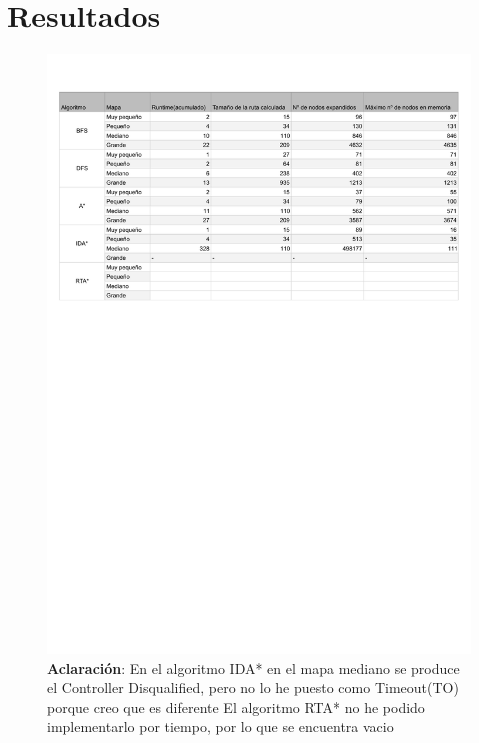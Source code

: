 \documentclass{article}
\begin{document}
\newpage \section{\large{Resultados}}
\begin{figure}[h]
  \includegraphics[scale=0.5]{resultados.pdf}
  \centering
  \caption{\textbf{Aclaración}: En el algoritmo IDA* en el mapa mediano se produce el Controller Disqualified, pero no 
  lo he puesto como Timeout(TO) porque creo que es diferente \newline El algoritmo RTA* no he podido implementarlo por tiempo, por lo que se 
  encuentra vacio}
\end{figure}
\end{document}
